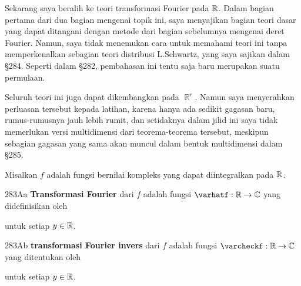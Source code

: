 
\def\chaptername{Analisis Fourier}
\def\sectionname{Transformasi Fourier I}


Sekarang saya beralih ke teori transformasi Fourier pada $\Bbb R$. Dalam
bagian pertama dari dua bagian mengenai topik ini, saya menyajikan bagian teori
dasar yang dapat ditangani dengan metode dari bagian sebelumnya mengenai deret
Fourier. Namun, saya tidak menemukan cara untuk memahami teori ini tanpa
memperkenalkan sebagian teori distribusi L.Schwartz, yang saya sajikan dalam
\S284. Seperti dalam \S282, pembahasan ini tentu saja baru merupakan suatu
permulaan.

Seluruh teori ini juga dapat dikembangkan pada $\BbbR^r$. Namun saya
menyerahkan perluasan tersebut kepada latihan, karena hanya ada sedikit
gagasan baru, rumus-rumusnya jauh lebih rumit, dan setidaknya dalam jilid ini
saya tidak memerlukan versi multidimensi dari teorema-teorema tersebut,
meskipun sebagian gagasan yang sama akan muncul dalam bentuk multidimensi
dalam \S285.

 Misalkan $f$ adalah fungsi bernilai kompleks yang
dapat diintegralkan pada $\Bbb R$.


\spheader 283Aa {\bf Transformasi Fourier} dari $f$ adalah fungsi
  $\varhatf:\Bbb R\to\Bbb C$ yang didefinisikan oleh


\noindent untuk setiap $y\in\Bbb R$.   

\spheader 283Ab  {\bf transformasi Fourier invers} dari $f$ adalah
fungsi $\varcheckf:\Bbb R\to\Bbb C$ yang ditentukan oleh


\noindent untuk setiap $y\in\Bbb R$.


